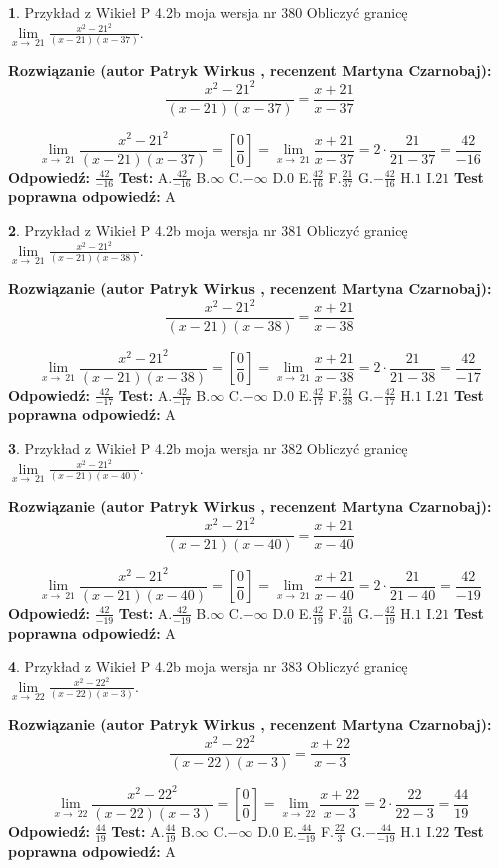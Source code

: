 \documentclass[12pt, a4paper]{article}
\theoremstyle{definition} %
\newtheorem{zad}{}
\newcommand{\zadStart}[1]{\begin{zad}#1\newline}
\newcommand{\zadStop}{\end{zad}}
\newcommand{\rozwStart}[2]{\noindent \textbf{Rozwiązanie (autor #1 , recenzent #2): }\newline}
\newcommand{\rozwStop}{\newline}
\newcommand{\odpStart}{\noindent \textbf{Odpowiedź:}\newline}
\newcommand{\odpStop}{\newline}
\newcommand{\testStart}{\noindent \textbf{Test:}\newline}
\newcommand{\testStop}{\newline}
\newcommand{\kluczStart}{\noindent \textbf{Test poprawna odpowiedź:}\newline}
\newcommand{\kluczStop}{\newline}
\begin{document}
\zadStart{Przykład z Wikieł P 4.2b moja wersja nr 380}
Obliczyć granicę $\lim\limits_{x\to\ 21}\frac{x^{2}-21^{2}}{(x-21)(x-37)}$.
\zadStop
\rozwStart{Patryk Wirkus}{Martyna Czarnobaj}
$$\frac{x^{2}-21^{2}}{(x-21)(x-37)}=\frac{x+21}{x-37}$$

$$\lim\limits_{x\to\ 21}\frac{x^{2}-21^{2}}{(x-21)(x-37)}=[\frac{0}{0}]=\lim\limits_{x\to\ 21}\frac{x+21}{x-37}=2 \cdot \frac{21}{21-37} = \frac{42}{-16}$$
\rozwStop
\odpStart
$\frac{42}{-16}$
\odpStop
\testStart
A.$\frac{42}{-16}$
B.$\infty$
C.$-\infty$
D.$0$
E.$\frac{42}{16}$
F.$\frac{21}{37}$
G.$-\frac{42}{16}$
H.$1$
I.$21$
\testStop
\kluczStart
A
\kluczStop



\zadStart{Przykład z Wikieł P 4.2b moja wersja nr 381}
Obliczyć granicę $\lim\limits_{x\to\ 21}\frac{x^{2}-21^{2}}{(x-21)(x-38)}$.
\zadStop
\rozwStart{Patryk Wirkus}{Martyna Czarnobaj}
$$\frac{x^{2}-21^{2}}{(x-21)(x-38)}=\frac{x+21}{x-38}$$

$$\lim\limits_{x\to\ 21}\frac{x^{2}-21^{2}}{(x-21)(x-38)}=[\frac{0}{0}]=\lim\limits_{x\to\ 21}\frac{x+21}{x-38}=2 \cdot \frac{21}{21-38} = \frac{42}{-17}$$
\rozwStop
\odpStart
$\frac{42}{-17}$
\odpStop
\testStart
A.$\frac{42}{-17}$
B.$\infty$
C.$-\infty$
D.$0$
E.$\frac{42}{17}$
F.$\frac{21}{38}$
G.$-\frac{42}{17}$
H.$1$
I.$21$
\testStop
\kluczStart
A
\kluczStop



\zadStart{Przykład z Wikieł P 4.2b moja wersja nr 382}
Obliczyć granicę $\lim\limits_{x\to\ 21}\frac{x^{2}-21^{2}}{(x-21)(x-40)}$.
\zadStop
\rozwStart{Patryk Wirkus}{Martyna Czarnobaj}
$$\frac{x^{2}-21^{2}}{(x-21)(x-40)}=\frac{x+21}{x-40}$$

$$\lim\limits_{x\to\ 21}\frac{x^{2}-21^{2}}{(x-21)(x-40)}=[\frac{0}{0}]=\lim\limits_{x\to\ 21}\frac{x+21}{x-40}=2 \cdot \frac{21}{21-40} = \frac{42}{-19}$$
\rozwStop
\odpStart
$\frac{42}{-19}$
\odpStop
\testStart
A.$\frac{42}{-19}$
B.$\infty$
C.$-\infty$
D.$0$
E.$\frac{42}{19}$
F.$\frac{21}{40}$
G.$-\frac{42}{19}$
H.$1$
I.$21$
\testStop
\kluczStart
A
\kluczStop



\zadStart{Przykład z Wikieł P 4.2b moja wersja nr 383}
Obliczyć granicę $\lim\limits_{x\to\ 22}\frac{x^{2}-22^{2}}{(x-22)(x-3)}$.
\zadStop
\rozwStart{Patryk Wirkus}{Martyna Czarnobaj}
$$\frac{x^{2}-22^{2}}{(x-22)(x-3)}=\frac{x+22}{x-3}$$

$$\lim\limits_{x\to\ 22}\frac{x^{2}-22^{2}}{(x-22)(x-3)}=[\frac{0}{0}]=\lim\limits_{x\to\ 22}\frac{x+22}{x-3}=2 \cdot \frac{22}{22-3} = \frac{44}{19}$$
\rozwStop
\odpStart
$\frac{44}{19}$
\odpStop
\testStart
A.$\frac{44}{19}$
B.$\infty$
C.$-\infty$
D.$0$
E.$\frac{44}{-19}$
F.$\frac{22}{3}$
G.$-\frac{44}{-19}$
H.$1$
I.$22$
\testStop
\kluczStart
A
\kluczStop
\end{document}
